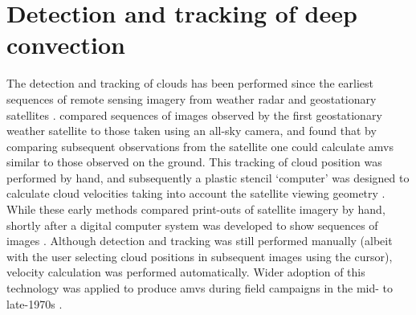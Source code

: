 


\section{Detection and tracking of deep convection} \label{sec:tracking_timeline}

The detection and tracking of clouds has been performed since the earliest sequences of remote sensing imagery from weather radar and geostationary satellites \citep{menzel_cloud_2001}.
\citet{fujita_study_1968} compared sequences of images observed by the first geostationary weather satellite to those taken using an all-sky camera, and found that by comparing subsequent observations from the satellite one could calculate \acrshort{amv}s similar to those observed on the ground.
This tracking of cloud position was performed by hand, and subsequently a plastic stencil `computer' was designed to calculate cloud velocities taking into account the satellite viewing geometry \citep{fujita_present_1969}.
While these early methods compared print-outs of satellite imagery by hand, shortly after a digital computer system was developed to show sequences of images \citep{chang_metracom_1973}.
Although detection and tracking was still performed manually (albeit with the user selecting cloud positions in subsequent images using the cursor), velocity calculation was performed automatically.
Wider adoption of this technology was applied to produce \acrshort{amv}s during field campaigns in the mid- to late-1970s \citep{tecson_cloud-motion_1975}.


